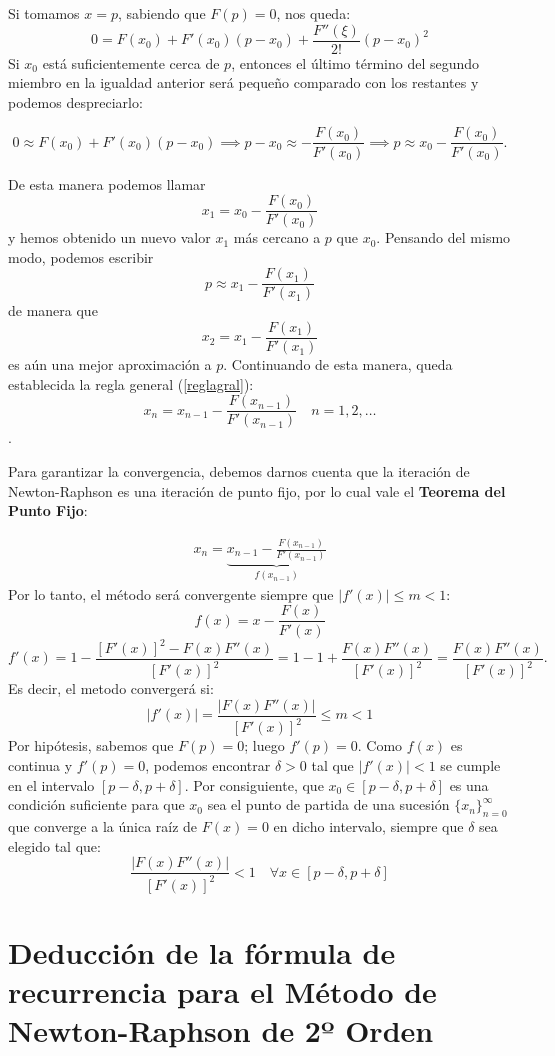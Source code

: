 \documentclass[openany]{book}
\begin{document}
Si tomamos \(x = p\), sabiendo que \(F(p) = 0\), nos queda:
\[0 = F(x_0) + F'(x_0)(p-x_0) + \frac{F''(\xi)}{2!}(p-x_0)^2\]
Si \(x_0\) está suficientemente cerca de \(p\), entonces el último término del segundo miembro en la igualdad anterior será pequeño comparado con los restantes y podemos despreciarlo:

\begin{equation}
\label{relacion}
0 \approx F(x_0) + F'(x_0)(p-x_0) \implies p-x_0 \approx - \frac{F(x_0)}{F'(x_0)} \implies p \approx x_0 - \frac{F(x_0)}{F'(x_0)}.
\end{equation}

De esta manera podemos llamar \[x_1 = x_0 - \frac{F(x_0)}{F'(x_0)}\] y hemos obtenido un nuevo valor \(x_1\) más cercano a \(p\) que \(x_0\). Pensando del mismo modo, podemos escribir \[p \approx x_1 - \frac{F(x_1)}{F'(x_1)}\] de manera que \[x_2 = x_1 - \frac{F(x_1)}{F'(x_1)}\] es aún una mejor aproximación a \(p\). Continuando de esta manera, queda establecida la regla general (\ref{reglagral}): \[x_n = x_{n-1} - \frac{F(x_{n-1})}{F'(x_{n-1})} \quad n=1,2,\dots\].

Para garantizar la convergencia, debemos darnos cuenta que la iteración de Newton-Raphson es una iteración de punto fijo, por lo cual vale el \textbf{Teorema del Punto Fijo}:

\begin{gather*}
x_n = 
\underbrace{x_{n-1} - \frac{F(x_{n-1})}{F'(x_{n-1})}}_{f(x_{n-1})} 
\end{gather*}
Por lo tanto, el método será convergente siempre que \(|f'(x)| \leq m < 1\):
\[f(x) = x - \frac{F(x)}{F'(x)}\]
\[f'(x) = 1 - \frac{[F'(x)]^2 - F(x)F''(x)}{[F'(x)]^2} = 1 - 1 + \frac{F(x)F''(x)}{[F'(x)]^2} = \frac{F(x)F''(x)}{[F'(x)]^2}.\]
Es decir, el metodo convergerá si:
\[|f'(x)| = \frac{|F(x)F''(x)|}{[F'(x)]^2} \leq m < 1\]
Por hipótesis, sabemos que \(F(p) = 0\); luego \(f'(p) = 0\). Como \(f(x)\) es continua y \(f'(p) = 0\), podemos encontrar \(\delta > 0\) tal que \(|f'(x)| < 1\) se cumple en el intervalo \([p - \delta, p + \delta]\). Por consiguiente, que \(x_0 \in [p - \delta, p + \delta]\) es una condición suficiente para que \(x_0\) sea el punto de partida de una sucesión \(\{x_n\}_{n=0}^{\infty}\) que converge a la única raíz de \(F(x) = 0\) en dicho intervalo, siempre que \(\delta\) sea elegido tal que:
\[\frac{|F(x)F''(x)|}{[F'(x)]^2} < 1  \quad \forall x \in [p - \delta, p + \delta]\]

\hypertarget{deducciuxf3n-de-la-fuxf3rmula-de-recurrencia-para-el-muxe9todo-de-newton-raphson-de-2uxba-orden}{%
\section*{Deducción de la fórmula de recurrencia para el Método de Newton-Raphson de 2º Orden}\label{deducciuxf3n-de-la-fuxf3rmula-de-recurrencia-para-el-muxe9todo-de-newton-raphson-de-2uxba-orden}}
\end{document}
